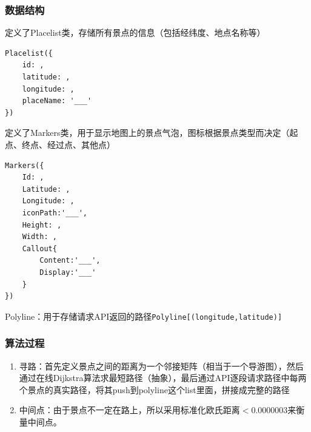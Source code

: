 \documentclass[12pt,UTF8]{ctexart}
\begin{document}
\begin{spacing}{1.4}
\subsubsection{数据结构}
定义了Placelist类，存储所有景点的信息（包括经纬度、地点名称等）
\begin{lstlisting}
Placelist({
	id: ,
	latitude: ,
	longitude: , 
	placeName: '___'
})
\end{lstlisting}
定义了Markers类，用于显示地图上的景点气泡，图标根据景点类型而决定（起点、终点、经过点、其他点）
\begin{lstlisting}
Markers({
	Id: ,
	Latitude: ,
	Longitude: ,
	iconPath:'___',
	Height: ,
	Width: ,
	Callout{
		Content:'___',
		Display:'___'
	}
})
\end{lstlisting}
Polyline：用于存储请求API返回的路径\verb'Polyline[(longitude,latitude)]'

\subsubsection{算法过程}
\begin{enumerate}
	\item 寻路：首先定义景点之间的距离为一个邻接矩阵（相当于一个导游图），然后通过在线Dijkstra算法求最短路径（抽象），最后通过API逐段请求路径中每两个景点的真实路径，将其push到polyline这个list里面，拼接成完整的路径
	\item 中间点：由于景点不一定在路上，所以采用标准化欧氏距离$<0.0000003$来衡量中间点。
\end{enumerate}


\end{spacing}
\end{document}
